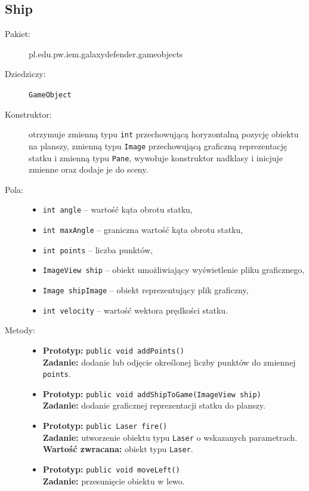 \documentclass[a4paper]{article}
\newcommand{\prog}{\texttt}
\begin{document}
\subsection{Ship}
\begin{description}
    \item[Pakiet:] pl.edu.pw.iem.galaxydefender.gameobjects
    \item[Dziedziczy:] \prog{GameObject}
    \item[Konstruktor:] otrzymuje zmienną typu \prog{int} przechowującą horyzontalną pozycję obiektu na planszy, zmienną typu \prog{Image} przechowującą graficzną reprezentację statku i zmienną typu \prog{Pane}, wywołuje konstruktor nadklasy i inicjuje zmienne oraz dodaje je do sceny.
    \item[Pola:] \hfill
    \begin{itemize}
        \item \prog{int angle} -- wartość kąta obrotu statku,
        \item \prog{int maxAngle} -- graniczna wartość kąta obrotu statku,
        \item \prog{int points} -- liczba punktów,
        \item \prog{ImageView ship} -- obiekt umożliwiający wyświetlenie pliku graficznego,
        \item \prog{Image shipImage} -- obiekt reprezentujący plik graficzny,
        \item \prog{int velocity} -- wartość wektora prędkości statku.
    \end{itemize}
    \item[Metody:] \hfill
    \begin{itemize}
        \item \textbf{Prototyp:} \prog{public void addPoints()}\\\textbf{Zadanie:} dodanie lub odjęcie określonej liczby punktów do zmiennej \prog{points}.
        \item \textbf{Prototyp:} \prog{public void addShipToGame(ImageView ship)}\\\textbf{Zadanie:} dodanie graficznej reprezentacji statku do planszy.
        \item \textbf{Prototyp:} \prog{public Laser fire()}\\\textbf{Zadanie:} utworzenie obiektu typu \prog{Laser} o wskazanych parametrach.\\\textbf{Wartość zwracana:} obiekt typu \prog{Laser}.
        \item \textbf{Prototyp:} \prog{public void moveLeft()}\\\textbf{Zadanie:} przesunięcie obiektu w lewo.

\end{itemize}
\end{description}
\end{document}
